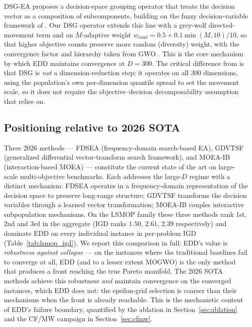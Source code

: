 \documentclass[preprint,12pt]{elsarticle}
\begin{document}
DSG-EA \cite{zou2024two} proposes a decision-space grouping operator that
treats the decision vector as a composition of subcomponents, building on the
fuzzy decision-variable framework of \cite{yang2023a}. Our DSG operator
extends this line with a grey-wolf directed-movement term and an
$M$-adaptive weight $w_{\mathrm{rand}} = 0.5 + 0.1\min(M,10)/10$, so that
higher objective counts preserve more random (diversity) weight, with the
convergence factor and hierarchy taken from GWO \cite{mirjalili2014grey}.
This is the core mechanism by which EDD maintains convergence at $D = 300$.
The critical difference from \cite{zou2024two} is that DSG is \emph{not} a
dimension-reduction step: it operates on all 300 dimensions, using the
population's own per-dimension quantile spread to set the movement scale, so
it does not require the objective--decision decomposability assumption that
\cite{zou2024two} relies on.

\subsection{Positioning relative to 2026 SOTA}

Three 2026 methods --- FDSEA \cite{fdsea2026} (frequency-domain
search-based EA), GDVTSF \cite{gdvtsf2026} (generalized differential
vector-transform search framework), and MOEA-IB \cite{moaib2026}
(interaction-based MOEA) --- constitute the current state of the art on
large-scale multi-objective benchmarks. Each addresses the large-$D$
regime with a distinct mechanism: FDSEA operates in a frequency-domain
representation of the decision space to preserve long-range structure;
GDVTSF transforms the decision variables through a learned vector
transformation; MOEA-IB couples interactive subpopulation mechanisms.
On the LSMOP family these three methods rank 1st, 2nd and 3rd in the
aggregate (IGD ranks $1.50$, $2.61$, $2.39$ respectively) and dominate EDD
on every individual instance in per-problem IGD (Table~\ref{tab:lsmop_igd}).
We report this comparison in full: EDD's value is \emph{robustness against
collapse} --- on the instances where the traditional baselines fail to
converge at all, EDD (and to a lesser extent MOGWO) is the only method
that produces a front reaching the true Pareto manifold. The 2026 SOTA
methods achieve this robustness \emph{and} maintain convergence on the
converged instances, which EDD does not: the epsilon-grid selection is
coarser than their mechanisms when the front is already reachable. This is
the mechanistic content of EDD's failure boundary, quantified by the
ablation in Section~\ref{sec:ablation} and the CF/MW campaign in
Section~\ref{sec:cfmw}.
\end{document}
